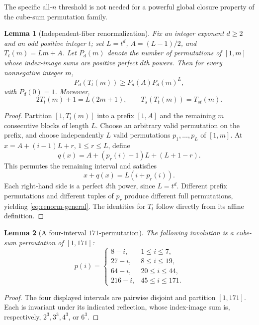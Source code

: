 \documentclass[10pt]{article}
\newtheorem{lemma}{Lemma}
\begin{document}
The specific all-$n$ threshold is not needed for
a powerful global closure property of the
cube-sum permutation family.

\begin{lemma}[Independent-fiber renormalization]
\label{lem:renorm-general}
Fix an integer exponent $d\ge2$ and an odd
positive integer $t$; set
$L=t^d$, $A=(L-1)/2$, and
$T_t(m)=Lm+A$.
Let $P_d(m)$ denote the number of permutations
of $[1,m]$ whose index-image sums are
positive perfect $d$th powers.
Then for every nonnegative integer $m$,
\begin{equation}\label{eq:renorm-general}
\boxed{P_d(T_t(m))\ge P_d(A)P_d(m)^L,}
\end{equation}
with $P_d(0)=1$. Moreover,
\[
2T_t(m)+1=L(2m+1),\qquad
T_s(T_t(m))=T_{st}(m).
\]
\end{lemma}
\begin{proof}
Partition $[1,T_t(m)]$ into a prefix
$[1,A]$ and the remaining $m$ consecutive
blocks of length $L$.
Choose an arbitrary valid permutation on
the prefix, and choose independently
$L$ valid permutations
$p_1,\ldots,p_L$ of $[1,m]$.
At $x=A+(i-1)L+r$, $1\le r\le L$, define
\[
q(x)=A+(p_r(i)-1)L+(L+1-r).
\]
This permutes the remaining interval
and satisfies
\[
x+q(x)=L(i+p_r(i)).
\]
Each right-hand side is a perfect $d$th
power, since $L=t^d$.
Different prefix permutations and
different tuples of $p_r$ produce
different full permutations, yielding
\eqref{eq:renorm-general}.
The identities for $T_t$ follow directly
from its affine definition.
\end{proof}

\begin{lemma}[A four-interval $171$-permutation]
\label{lem:171}
The following involution is a cube-sum
permutation of $[1,171]$:
\[
p(i)=
\begin{cases}
8-i,&1\le i\le7,\\
27-i,&8\le i\le19,\\
64-i,&20\le i\le44,\\
216-i,&45\le i\le171.
\end{cases}
\]
\end{lemma}
\begin{proof}
The four displayed intervals are
pairwise disjoint and partition $[1,171]$.
Each is invariant under its indicated
reflection, whose index-image sum is,
respectively, $2^3,3^3,4^3$, or $6^3$.
\end{proof}
\end{document}
